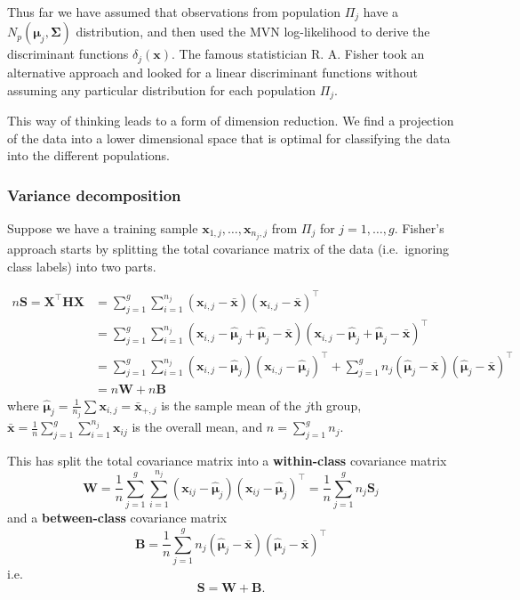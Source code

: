 \documentclass[
]{book}
\theoremstyle{definition}
\theoremstyle{definition}
\theoremstyle{definition}
\theoremstyle{definition}
\theoremstyle{remark}
\begin{document}
Thus far we have assumed that observations from population \(\Pi_j\) have a \(N_p ( \boldsymbol{\mu}_j, {\mathbf \Sigma})\) distribution, and then used the MVN log-likelihood to derive the discriminant functions \(\delta_j(\mathbf x)\). The famous statistician R. A. Fisher took an alternative approach and looked for a linear discriminant functions without assuming any particular distribution for each population \(\Pi_j\).

This way of thinking leads to a form of dimension reduction. We find a projection of the data into a lower dimensional space that is optimal for classifying the data into the different populations.

\hypertarget{variance-decomposition}{%
\subsubsection*{Variance decomposition}\label{variance-decomposition}}

Suppose we have a training sample \(\mathbf x_{1,j}, \ldots, \mathbf x_{n_j,j}\) from \(\Pi_j\) for \(j=1,\ldots,g\).
Fisher's approach starts by splitting the total covariance matrix of the data (i.e.~ignoring class labels) into two parts.

\begin{align*}
n\mathbf S=\mathbf X^\top\mathbf H\mathbf X&= \sum_{j=1}^g\sum_{i=1}^{n_j} (\mathbf x_{i,j} - \bar{\mathbf x})(\mathbf x_{i,j} - \bar{\mathbf x})^\top\\
&=\sum_{j=1}^g\sum_{i=1}^{n_j} (\mathbf x_{i,j} - \hat{{\boldsymbol{\mu}}}_j+\hat{{\boldsymbol{\mu}}}_j-\bar{\mathbf x})(\mathbf x_{i,j} - \hat{{\boldsymbol{\mu}}}_j+\hat{{\boldsymbol{\mu}}}_j-\bar{\mathbf x})^\top\\
&= \sum_{j=1}^g\sum_{i=1}^{n_j} (\mathbf x_{i,j} - \hat{{\boldsymbol{\mu}}}_j)(\mathbf x_{i,j} - \hat{{\boldsymbol{\mu}}}_j)^\top+
\sum_{j=1}^g n_j (\hat{{\boldsymbol{\mu}}}_j-\bar{\mathbf x})(\hat{{\boldsymbol{\mu}}}_j-\bar{\mathbf x})^\top\\
&=n\mathbf W+n\mathbf B
\end{align*}
where \(\hat{{\boldsymbol{\mu}}}_j=\frac{1}{n_j} \sum \mathbf x_{i,j} = \bar{\mathbf x}_{+,j}\) is the sample mean of the \(j\)th group, \(\bar{\mathbf x} = \frac{1}{n} \sum_{j=1}^g \sum_{i=1}^{n_j} \mathbf x_{ij}\) is the overall mean, and \(n=\sum_{j=1}^g n_j\).

This has split the total covariance matrix into a \textbf{within-class} covariance matrix
\[ \mathbf W= \frac{1}{n}\sum_{j=1}^g \sum_{i=1}^{n_j} (\mathbf x_{ij} - \hat{{\boldsymbol{\mu}}}_j) (\mathbf x_{ij} - \hat{{\boldsymbol{\mu}}}_j)^\top  = \frac{1}{n}\sum_{j=1}^g n_j \mathbf S_j \]
and a \textbf{between-class} covariance matrix
\[ \mathbf B= \frac{1}{n}\sum_{j=1}^g n_j (\hat{{\boldsymbol{\mu}}}_j - \bar{\mathbf x}) (\hat{{\boldsymbol{\mu}}}_j - \bar{\mathbf x})^\top\]
i.e.
\[\mathbf S= \mathbf W+ \mathbf B.\]
\end{document}
